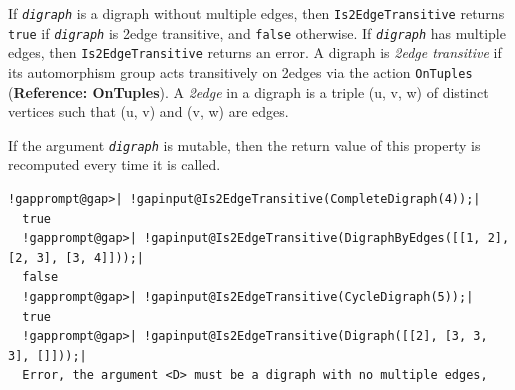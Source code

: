 \documentclass[a4paper,11pt]{report}
\begin{document}
{{{ If \mbox{\texttt{\mdseries\slshape digraph}} is a digraph without multiple edges, then \texttt{Is2EdgeTransitive} returns \texttt{true} if \mbox{\texttt{\mdseries\slshape digraph}} is 2\texttt{}edge transitive, and \texttt{false} otherwise. If \mbox{\texttt{\mdseries\slshape digraph}} has multiple edges, then \texttt{Is2EdgeTransitive} returns an error. A digraph is \emph{2\texttt{}edge transitive} if its automorphism group acts transitively on 2\texttt{}edges via
the action \texttt{OnTuples} (\textbf{Reference: OnTuples}). A \emph{2\texttt{}edge} in a digraph is a triple (u, v, w) of distinct vertices such that (u, v) and
(v, w) are edges. 

 If the argument \mbox{\texttt{\mdseries\slshape digraph}} is mutable, then the return value of this property is recomputed every time it
is called.

 
\begin{Verbatim}[commandchars=!@|,fontsize=\small,frame=single,label=Example]
  !gapprompt@gap>| !gapinput@Is2EdgeTransitive(CompleteDigraph(4));|
  true
  !gapprompt@gap>| !gapinput@Is2EdgeTransitive(DigraphByEdges([[1, 2], [2, 3], [3, 4]]));|
  false
  !gapprompt@gap>| !gapinput@Is2EdgeTransitive(CycleDigraph(5));|
  true
  !gapprompt@gap>| !gapinput@Is2EdgeTransitive(Digraph([[2], [3, 3, 3], []]));|
  Error, the argument <D> must be a digraph with no multiple edges,
\end{Verbatim}
 }

 }

 }

 
\end{document}
